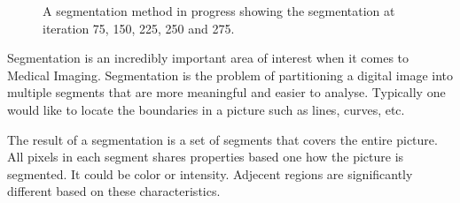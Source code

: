 \begin{figure}[h]
\begin{center}
\end{center}
\caption{A segmentation method in progress showing the segmentation at
  iteration 75, 150, 225, 250 and 275.}
\label{fig:segmentation}
\end{figure}


Segmentation is an incredibly important area of interest when it comes
to Medical Imaging. Segmentation is the problem of partitioning a
digital image into multiple segments that are more meaningful and
easier to analyse. Typically one would like to locate the boundaries
in a picture such as lines, curves, etc.

The result of a segmentation is a set of segments that covers the
entire picture. All pixels in each segment shares properties based one
how the picture is segmented. It could be color or intensity. Adjecent
regions are significantly different based on these characteristics.

